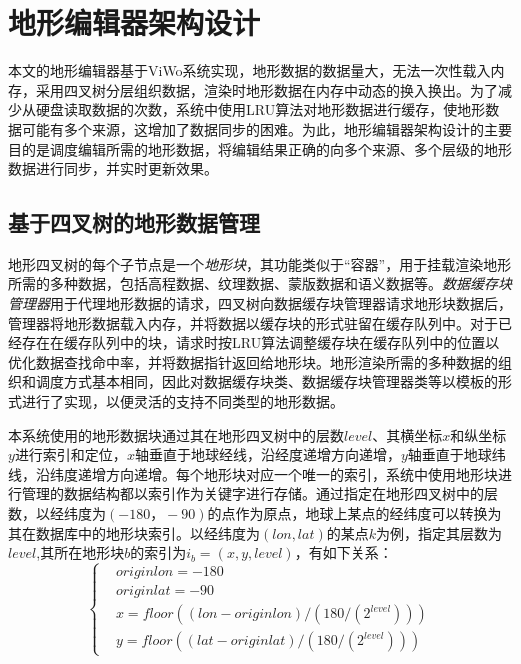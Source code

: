 
\chapter{地形编辑器架构设计}
本文的地形编辑器基于ViWo系统实现，地形数据的数据量大，无法一次性载入内存，采用四叉树分层组织数据，渲染时地形数据在内存中动态的换入换出。为了减少从硬盘读取数据的次数，系统中使用LRU算法对地形数据进行缓存，使地形数据可能有多个来源，这增加了数据同步的困难。为此，地形编辑器架构设计的主要目的是调度编辑所需的地形数据，将编辑结果正确的向多个来源、多个层级的地形数据进行同步，并实时更新效果。\par
\section{基于四叉树的地形数据管理}
地形四叉树的每个子节点是一个\textit{地形块}，其功能类似于“容器”，用于挂载渲染地形所需的多种数据，包括高程数据、纹理数据、蒙版数据和语义数据等。\textit{数据缓存块管理器}用于代理地形数据的请求，四叉树向数据缓存块管理器请求地形块数据后，管理器将地形数据载入内存，并将数据以缓存块的形式驻留在缓存队列中。对于已经存在在缓存队列中的块，请求时按LRU算法调整缓存块在缓存队列中的位置以优化数据查找命中率，并将数据指针返回给地形块。地形渲染所需的多种数据的组织和调度方式基本相同，因此对数据缓存块类、数据缓存块管理器类等以模板的形式进行了实现，以便灵活的支持不同类型的地形数据。\par
本系统使用的地形数据块通过其在地形四叉树中的层数$level$、其横坐标$x$和纵坐标$y$进行索引和定位，$x$轴垂直于地球经线，沿经度递增方向递增，$y$轴垂直于地球纬线，沿纬度递增方向递增。每个地形块对应一个唯一的索引，系统中使用地形块进行管理的数据结构都以索引作为关键字进行存储。通过指定在地形四叉树中的层数，以经纬度为$(-180，-90)$的点作为原点，地球上某点的经纬度可以转换为其在数据库中的地形块索引。以经纬度为$(lon,lat)$的某点$k$为例，指定其层数为$level$,其所在地形块$b$的索引为$i_b=(x,y,level)$，有如下关系：
\begin{equation}
\left\{ \begin{aligned}
&originlon=-180\\
&originlat=-90\\
&x=floor((lon-originlon)/(180/(2^{level})))\\
&y=floor((lat-originlat)/(180/(2^{level})))
\end{aligned}\right.
\end{equation}


